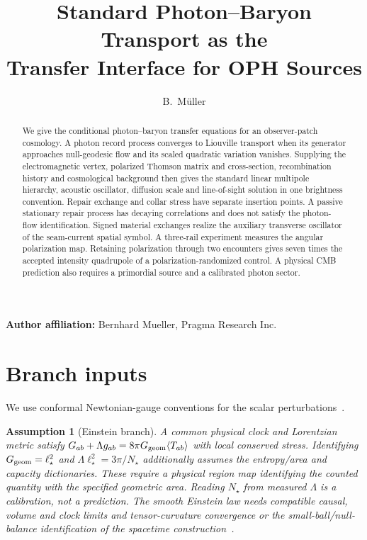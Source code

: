 \documentclass[11pt]{article}
\title{Standard Photon--Baryon Transport as the\\
Transfer Interface for OPH Sources}
\author{B.\ M\"uller}
\date{\OPHPaperReleaseDate}
\newtheorem{assumption}[theorem]{Assumption}
\theoremstyle{remark}
\begin{document}
\maketitle
\OPHPaperReleaseBanner

\begin{center}
\small\textbf{Author affiliation:} Bernhard Mueller, Pragma Research Inc.
\end{center}

\begin{abstract}
We give the conditional photon--baryon transfer equations for an
observer-patch cosmology. A photon record process converges to Liouville
transport when its generator approaches null-geodesic flow and its scaled
quadratic variation vanishes. Supplying the electromagnetic vertex,
polarized Thomson matrix and cross-section, recombination history and
cosmological background then gives the standard linear multipole hierarchy,
acoustic oscillator, diffusion scale and line-of-sight solution in one
brightness convention. Repair exchange and collar stress have separate
insertion points. A passive stationary repair process has decaying
correlations and does not satisfy the photon-flow identification.
Signed material exchanges realize the auxiliary transverse oscillator of the
seam-current spatial symbol. A three-rail experiment measures the angular
polarization map.
Retaining polarization through two encounters gives seven times the
accepted intensity quadrupole of a polarization-randomized control.
A physical CMB prediction also requires a primordial source and a
calibrated photon sector.

\end{abstract}

\section{Branch inputs}
We use conformal Newtonian-gauge conventions for the scalar
perturbations~\cite{mabertschinger,dodelson}.



\begin{assumption}[Einstein branch]\label{a:geom}
A common physical clock and Lorentzian metric satisfy
\(G_{ab}+\Lambda g_{ab}=8\pi G_{\rm geom}\langle T_{ab}\rangle\)
with local conserved stress. Identifying \(G_{\rm geom}=\ell_\star^2\)
and \(\Lambda\ell_\star^2=3\pi/N_\star\) additionally assumes the
entropy/area and capacity dictionaries. These require a physical region map identifying the counted quantity
with the specified geometric area. Reading \(N_\star\) from measured
\(\Lambda\) is a calibration, not a prediction.
The smooth Einstein law needs compatible causal, volume and clock limits
and tensor-curvature convergence or the small-ball/null-balance identification
of the spacetime construction~\cite{ophEinstein}.
\end{assumption}
\end{document}
